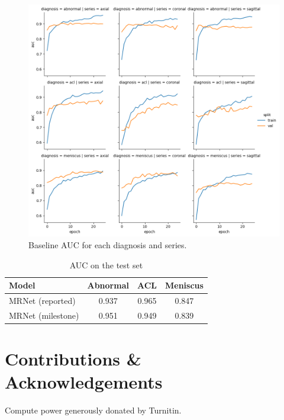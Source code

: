 \documentclass[10pt,twocolumn,letterpaper]{article}
\begin{document}
\begin{figure}
\begin{center}
\includegraphics[width=0.5\linewidth]{../images/MRNet-aug_auc.png}
\end{center}
   \caption{Baseline AUC for each diagnosis and series.}
\label{fig:mrnet_auc}
\end{figure}

\begin{table}[bp]
\begin{center}
\begin{tabular}{|l|c|c|c|}
\hline
Model & Abnormal & ACL & Meniscus \\
\hline\hline
MRNet (reported) & 0.937 & 0.965 & 0.847 \\
MRNet (milestone) & 0.951 & 0.949 & 0.839 \\
\hline
\end{tabular}
\end{center}
\caption{AUC on the test set}
\label{tab:results}
\end{table}

\section{Contributions \& Acknowledgements}

Compute power generously donated by Turnitin.

{\small


}

\end{document}
